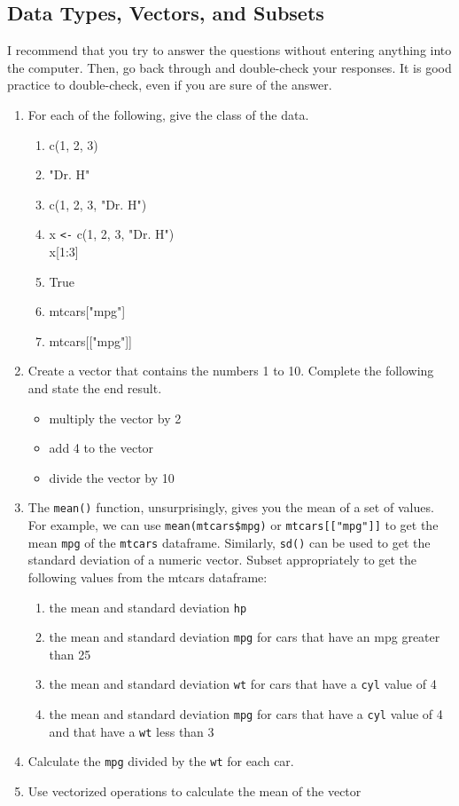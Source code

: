 \documentclass[letterpaper,12pt]{article}
\begin{document}
\subsection{Data Types, Vectors, and Subsets}

I recommend that you try to answer the questions without entering anything into the computer. Then, go back through and double-check your responses. It is good practice to double-check, even if you are sure of the answer.

\begin{enumerate}
    \item For each of the following, give the class of the data. 
    \begin{enumerate}
    \singlespacing
        \item c(1, 2, 3)
        \item "Dr. H"
        \item c(1, 2, 3, "Dr. H")
        \item x \verb|<-| c(1, 2, 3, "Dr. H") \\ x[1:3]
        \item True
        \item mtcars["mpg"]
        \item mtcars[["mpg"]]
    \end{enumerate}
    \doublespacing
    \item Create a vector that contains the numbers 1 to 10. Complete the following and state the end result. 
    \begin{itemize}
    \singlespacing
        \item multiply the vector by 2
        \item add 4 to the vector
        \item divide the vector by 10
    \end{itemize}
    \doublespacing
    \item The \verb|mean()| function, unsurprisingly, gives you the mean of a set of values. For example, we can use \verb|mean(mtcars$mpg)| or \verb|mtcars[["mpg"]]| to get the mean \verb|mpg| of the \verb|mtcars| dataframe. Similarly, \verb|sd()| can be used to get the standard deviation of a numeric vector. Subset appropriately to get the following values from the mtcars dataframe: 
    \begin{enumerate}
    \singlespacing
        \item the mean and standard deviation \verb|hp|
        \item the mean and standard deviation \verb|mpg| for cars that have an mpg greater than 25
        \item the mean and standard deviation \verb|wt| for cars that have a \verb|cyl| value of 4
        \item the mean and standard deviation \verb|mpg| for cars that have a \verb|cyl| value of 4 and that have a \verb|wt| less than 3
    \end{enumerate}
    \doublespacing
    \item Calculate the \verb|mpg| divided by the \verb|wt| for each car.
    \item Use vectorized operations to calculate the mean of the vector
    

\end{enumerate}
\end{document}
